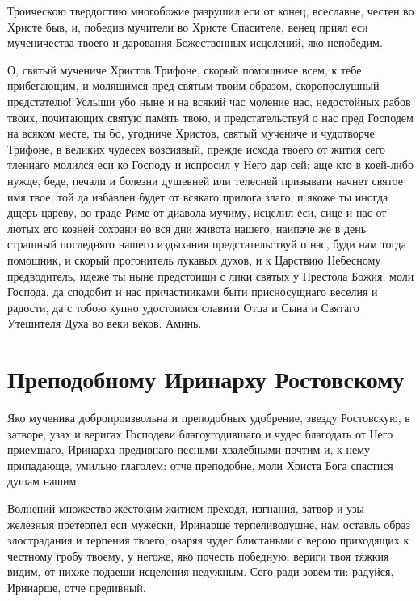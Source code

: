 

Троическою твердостию многобожие разрушил еси от конец, всеславне, честен во Христе быв, и, победив мучители во Христе Спасителе, венец приял еси мученичества твоего и дарования Божественных исцелений, яко непобедим.




О, святый мучениче Христов Трифоне, скорый помощниче всем, к тебе прибегающим, и молящимся пред святым твоим образом, скоропослушный предстателю! Услыши убо ныне и на всякий час моление нас, недостойных рабов твоих, почитающих святую память твою, и предстательствуй о нас пред Господем на всяком месте, ты бо, угодниче Христов, святый мучениче и чудотворче Трифоне, в великих чудесех возсиявый, прежде исхода твоего от жития сего тленнаго молился еси ко Господу и испросил у Него дар сей: аще кто в коей-либо нужде, беде, печали и болезни душевней или телесней призывати начнет святое имя твое, той да избавлен будет от всякаго прилога злаго, и якоже ты иногда дщерь цареву,  во граде Риме от диавола мучиму, исцелил еси, сице и нас от лютых его козней сохрани во вся дни живота нашего, наипаче же в день страшный последняго нашего издыхания предстательствуй о нас, буди нам тогда помошник, и скорый прогонитель лукавых духов, и к Царствию Небесному предводитель, идеже ты ныне предстоиши с лики святых у Престола Божия, моли Господа, да сподобит и нас причастниками быти присносущнаго веселия и радости, да с тобою купно удостоимся славити Отца и Сына и Святаго Утешителя Духа во веки веков. Аминь.


\section{Преподобному Иринарху Ростовскому}
 




Яко мученика добропроизвольна и преподобных удобрение, звезду Ростовскую, в затворе, узах и веригах Господеви благоугодившаго и чудес благодать от Него приемшаго, Иринарха предивнаго песньми хвалебными почтим и, к нему припадающе, умильно глаголем: отче преподобне, моли Христа Бога спастися душам нашим.




Волнений множество жестоким житием преходя, изгнания, затвор и узы железныя претерпел еси мужески, Иринарше терпеливодушне, нам оставль образ злострадания и терпения твоего, озаряя чудес блистаньми с верою приходящих к честному гробу твоему, у негоже, яко почесть победную, вериги твоя тяжкия видим, от нихже подаеши исцеления недужным. Сего ради зовем ти: радуйся, Иринарше, отче предивный.


